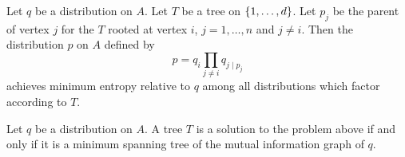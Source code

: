 \begin{prop}
  Let $q$ be a distribution on $A$. Let $T$ be
  a tree on $\{1, \dots, d\}$. Let $p_j$ be
  the parent of vertex $j$ for the $T$ rooted
  at vertex $i$, $j = 1,\dots,n$ and $j \neq i$.
  Then the distribution $p$ on $A$ defined by
  \[
    p = q_i \prod_{j \neq i} q_{j \mid p_j}
  \]
  achieves minimum entropy relative to $q$ among
  all distributions which factor according to $T$.
\end{prop}

\begin{prop}
  Let $q$ be a distribution on $A$.
  A tree
  $T$ is a solution to the problem above
  if and only if it is a minimum spanning
  tree of the mutual information graph of $q$.
\end{prop}
\strats
